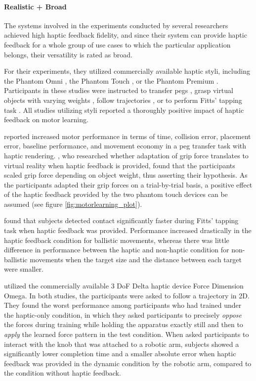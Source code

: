 \paragraph{Realistic + Broad} \label{sec:realisticbroad}
The systems involved in the experiments conducted by several researchers achieved high haptic feedback fidelity, and since their system can provide haptic feedback for a whole group of use cases to which the particular application belongs, their versatility is rated as broad.

For their experiments, they utilized commercially available haptic styli, including the Phantom Omni \cite{Brickler2019, Fehlberg2012}, the Phantom Touch \cite{Gunter2022}, or the Phantom Premium \cite{Wall2000}. Participants in these studies were instructed to transfer pegs \cite{Brickler2019}, grasp virtual objects with varying weights \cite{Gunter2022}, follow trajectories \cite{Fehlberg2012}, or to perform Fitts' tapping task \cite{Wall2000, Fitts1954TheMovement}. All studies utilizing styli reported a thoroughly positive impact of haptic feedback on motor learning.

\cite{Brickler2019} reported increased motor performance in terms of time, collision error, placement error, baseline performance, and movement economy in a peg transfer task with haptic rendering. \cite{Gunter2022}, who researched whether adaptation of grip force translates to virtual reality when haptic feedback is provided, found that the participants scaled grip force depending on object weight, thus asserting their hypothesis. As the participants adapted their grip forces on a trial-by-trial basis, a positive effect of the haptic feedback provided by the two phantom touch devices can be assumed (see figure \ref{fig:motorlearning_plot}). 

\cite{Wall2000} found that subjects detected contact significantly faster during Fitts' tapping task when haptic feedback was provided. Performance increased drastically in the haptic feedback condition for ballistic movements, whereas there was little difference in performance between the haptic and non-haptic condition for non-ballistic movements when the target size and the distance between each target were smaller.

\cite{Morris2007} utilized the commercially available 3 DoF Delta haptic device Force Dimension Omega. In both studies, the participants were asked to follow a trajectory in 2D. They found the worst performance among participants who had trained under the haptic-only condition, in which they asked participants to precisely \textit{oppose} the forces during training while holding the apparatus exactly still and then to \textit{apply} the learned force pattern in the test condition. 
When \cite{Dai2023} asked participants to interact with the knob that was attached to a robotic arm, subjects showed a significantly lower completion time and a smaller absolute error when haptic feedback was provided in the dynamic condition by the robotic arm, compared to the condition without haptic feedback.

